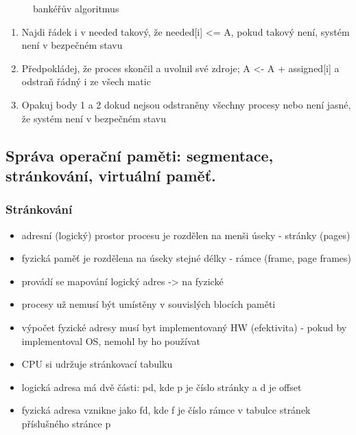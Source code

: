 \documentclass[10pt,a4paper]{article}
\begin{document}
\begin{itemize}
\begin{itemize}
\begin{itemize}
\begin{figure} [h]
			\caption{bankéřův algoritmus}	
			\end{figure}
			\begin{enumerate}
				\item Najdi řádek i v needed takový, že needed[i] <= A, pokud takový není, systém není v bezpečném stavu
				\item Předpokládej, že proces skončil a uvolnil své zdroje; A <- A + assigned[i] a odstraň řádný i ze všech matic
				\item Opakuj body 1 a 2 dokud nejsou odstraněny všechny procesy nebo není jasné, že systém není v bezpečném stavu
			\end{enumerate}
		\end{itemize}
	\end{itemize}
\end{itemize}


\subsection{ Správa operační paměti: segmentace, stránkování, virtuální paměť.}

\subsubsection{Stránkování}
\begin{itemize}
	\item adresní (logický) prostor procesu je rozdělen na menši úseky - stránky (pages)
	\item fyzická paměť je rozdělena na úseky stejné délky - rámce (frame, page frames)
	\item provádí se mapování logický adres -> na fyzické
	\item procesy už nemusí být umístěny v souvislých blocích paměti
	\item výpočet fyzické adresy musí byt implementovaný HW (efektivita) - pokud by implementoval
OS, nemohl by ho používat
	\item CPU si udržuje stránkovací tabulku
	\item logická adresa má dvě části: pd, kde p je číslo stránky a d je offset
	\item fyzická adresa vznikne jako fd, kde f je číslo rámce v tabulce stránek příslušného stránce p
\end{itemize}
\end{document}
